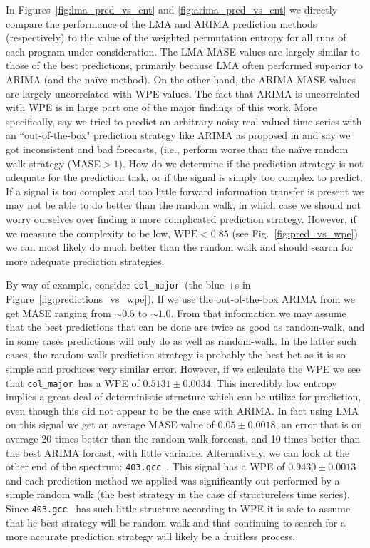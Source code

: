\documentclass{article}
\newcommand{\gcc}{{\tt 403.gcc}~}
\newcommand{\col}{{\tt col\_major}~}
\begin{document}
In Figures~\ref{fig:lma_pred_vs_ent} and \ref{fig:arima_pred_vs_ent} we directly
compare the performance of the LMA and ARIMA prediction methods (respectively)
to the value of the weighted permutation entropy for all runs of each program
under consideration. The LMA MASE values are largely similar to those of the
best predictions, primarily because LMA often performed superior to ARIMA (and
the na\"ive method). On the other hand, the ARIMA MASE values are largely
uncorrelated with WPE values. The fact that ARIMA is uncorrelated with WPE is in large part one of the major findings of this work. More specifically, say we tried to predict an arbitrary noisy real-valued time series with an ``out-of-the-box" prediction strategy like ARIMA as proposed in \cite{autoArima} and say we got inconsistent and bad forecasts, (i.e., perform worse than the na\"ive random walk strategy (MASE$>1$). How do we determine if the prediction
strategy is not adequate for the prediction task, or if the signal is simply too
complex to predict. If a signal is too complex and too little forward information transfer is present we may not be able to do better than the random walk, in which case we should not worry ourselves over finding a more complicated prediction strategy. However, if we measure the complexity to be low, $\textrm{WPE}<0.85$ (see Fig.~\ref{fig:pred_vs_wpe}) we can most likely do much better than the random walk and should search for more adequate prediction strategies. 



By way of example, consider \col (the blue +s in
Figure~\ref{fig:predictions_vs_wpe}). If we use the out-of-the-box ARIMA from \cite{autoArima} we get MASE ranging from $\sim0.5$ to
$\sim1.0$.  From that information we may assume that the best predictions that
can be done are twice as good as random-walk, and in some cases predictions will
only do as well as random-walk. In the latter such cases, the random-walk
prediction strategy is probably the best bet as it is so simple and produces
very similar error. However, if we calculate the WPE we see that \col has a WPE
of $0.5131 \pm 0.0034$. This incredibly low entropy implies a great deal of
deterministic structure which can be utilize for prediction, even though this
did not appear to be the case with ARIMA. In fact using LMA on this signal we
get an average MASE value of $0.05\pm0.0018$, an error that is on average 20
times better than the random walk forecast, and 10 times better than the best
ARIMA forcast, with little variance. Alternatively, we can look at the other end
of the spectrum: \gcc. This signal has a WPE of $0.9430\pm0.0013$ and each
prediction method we applied was significantly out performed by a simple random
walk (the best strategy in the case of structureless time series). Since \gcc
has such little structure according to WPE it is safe to assume that he best
strategy will be random walk and that continuing to search for a more accurate
prediction strategy will likely be a fruitless process.
\end{document}
